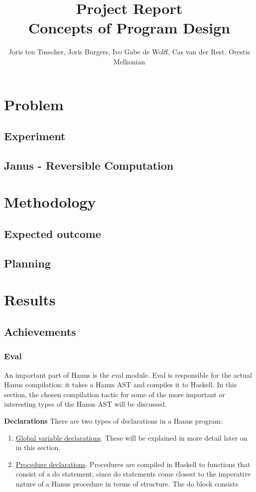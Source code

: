 \documentclass[12pt,a4paper]{article}
\title{\textbf{Project Report \\ \small{Concepts of Program Design}}}
\author{\small{Joris ten Tusscher, Joris Burgers, Ivo Gabe de Wolff, Cas van der Rest, Orestis Melkonian}}
\date{}
\begin{document}
\maketitle

\section{Problem}
    \subsection{Experiment}
    \subsection{Janus - Reversible Computation}
\section{Methodology}
	\subsection{Expected outcome}
	\subsection{Planning}
\section{Results}
	\subsection{Achievements}
		\subsubsection{Eval}
			An important part of Hanus is the eval module. Eval is responsible for the actual Hanus compilation: it takes a Hanus AST and compiles it to Haskell. In this section, the chosen compilation tactic for some of the more important or interesting types of the Hanus AST will be discussed.
			
			\leavevmode\newline\textbf{Declarations}\newline
				There are two types of declarations in a Hanus program:
				\begin{enumerate}
					\item
						\underline{Global variable declarations}. These will be explained in more detail later on in this section. 
					\item
						\underline{Procedure declarations}. Procedures are compiled in Haskell to functions that consist of a do statement, since do statements come closest to the imperative nature of a Hanus procedure in terms of structure. The do block consists 
				\end{enumerate}
			
\end{document}
